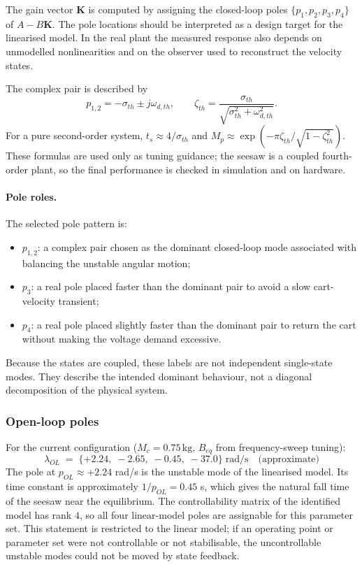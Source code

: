 \documentclass[11pt,a4paper]{article}
\begin{document}
The gain vector $\mathbf{K}$ is computed by assigning the closed-loop poles $\{p_1,p_2,p_3,p_4\}$ of $A-B\mathbf{K}$. The pole locations should be interpreted as a design target for the linearised model. In the real plant the measured response also depends on unmodelled nonlinearities and on the observer used to reconstruct the velocity states.

The complex pair is described by
\begin{equation}
	p_{1,2} = -\sigma_{th} \pm j\omega_{d,th}, \qquad
	\zeta_{th} = \frac{\sigma_{th}}{\sqrt{\sigma_{th}^2 + \omega_{d,th}^2}}.
\end{equation}
For a pure second-order system, $t_s \approx 4/\sigma_{th}$ and $M_p \approx \exp(-\pi\zeta_{th}/\sqrt{1-\zeta_{th}^2})$. These formulas are used only as tuning guidance; the seesaw is a coupled fourth-order plant, so the final performance is checked in simulation and on hardware.

\paragraph{Pole roles.} The selected pole pattern is:
\begin{itemize}
	\item $p_{1,2}$: a complex pair chosen as the dominant closed-loop mode associated with balancing the unstable angular motion;
	\item $p_3$: a real pole placed faster than the dominant pair to avoid a slow cart-velocity transient;
	\item $p_4$: a real pole placed slightly faster than the dominant pair to return the cart without making the voltage demand excessive.
\end{itemize}
Because the states are coupled, these labels are not independent single-state modes. They describe the intended dominant behaviour, not a diagonal decomposition of the physical system.

\subsubsection{Open-loop poles}

For the current configuration ($M_c = 0.75\,\text{kg}$, $B_{eq}$ from frequency-sweep tuning):
\begin{equation}
	\lambda_{OL} \;=\; \{+2.24, \;-2.65, \;-0.45, \;-37.0\}\;\text{rad/s}
	\quad\text{(approximate)}
\end{equation}
The pole at $p_{OL} \approx +2.24$ rad/s is the unstable mode of the linearised model. Its time constant is approximately $1/p_{OL} = 0.45$ s, which gives the natural fall time of the seesaw near the equilibrium. The controllability matrix of the identified model has rank $4$, so all four linear-model poles are assignable for this parameter set. This statement is restricted to the linear model; if an operating point or parameter set were not controllable or not stabilisable, the uncontrollable unstable modes could not be moved by state feedback.
\end{document}
